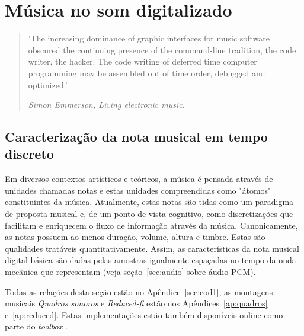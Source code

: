 \chapter{Música no som digitalizado} %
\label{cap:resultados} %
\begin{quotation}
\small
'The increasing dominance of graphic interfaces for music software obscured 
the continuing presence of the command-line tradition, 
the code writer, the hacker. The code writing of deferred time 
computer programming may be assembled out of time order, debugged and optimized.'

\emph{Simon Emmerson, Living electronic music.\cite{Emmerson}}
\end{quotation}


\section{Caracterização da nota musical em tempo discreto}\label{sec:notaDisc}
Em diversos contextos artísticos e teóricos, 
a música é pensada através de 
unidades chamadas notas e 
estas unidades compreendidas como "átomos" constituintes da música.\cite{Wisnick, Lovelock, Webern}
Atualmente, estas notas
são tidas como um paradigma de proposta musical
e, de um ponto de vista cognitivo, como discretizações
que facilitam e enriquecem o fluxo de informação através da música.\cite{Roederer, Lacerda}
Canonicamente, as notas possuem ao menos duração, volume, altura e timbre.\cite{Lacerda} Estas
são qualidades tratáveis quantitativamente.\cite{Roederer}
Assim, as características da nota musical digital básica são dadas pelas amostras igualmente espaçadas no tempo
da onda mecânica que representam (veja seção~\ref{sec:audio} sobre áudio PCM).

Todas as relações desta seção estão no Apêndice~\ref{sec:cod1}, as montagens musicais \emph{Quadros sonoros} e \emph{Reduced-fi} estão nos Apêndices~\ref{ap:quadros} e~\ref{ap:reduced}. Estas implementações estão também disponíveis online como parte do \emph{toolbox} \massa.\cite{MASSA}

